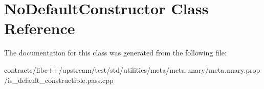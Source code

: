\hypertarget{class_no_default_constructor}{}\section{No\+Default\+Constructor Class Reference}
\label{class_no_default_constructor}


The documentation for this class was generated from the following file\+:\begin{DoxyCompactItemize}
\item 
contracts/libc++/upstream/test/std/utilities/meta/meta.\+unary/meta.\+unary.\+prop/is\+\_\+default\+\_\+constructible.\+pass.\+cpp\end{DoxyCompactItemize}
